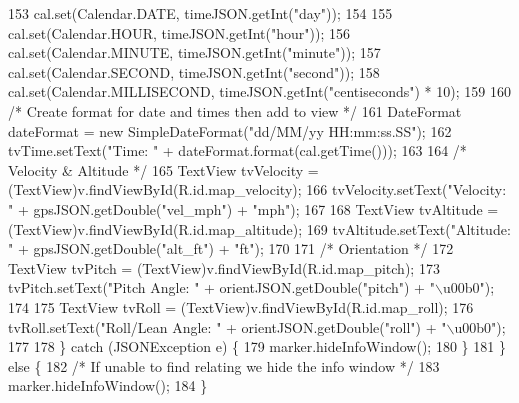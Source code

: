 \begin{DoxyCode}
153                         cal.set(Calendar.DATE, timeJSON.getInt(\textcolor{stringliteral}{"day"}));
154 
155                         cal.set(Calendar.HOUR, timeJSON.getInt(\textcolor{stringliteral}{"hour"}));
156                         cal.set(Calendar.MINUTE, timeJSON.getInt(\textcolor{stringliteral}{"minute"}));
157                         cal.set(Calendar.SECOND, timeJSON.getInt(\textcolor{stringliteral}{"second"}));
158                         cal.set(Calendar.MILLISECOND, timeJSON.getInt(\textcolor{stringliteral}{"centiseconds"}) * 10);
159 
160                         \textcolor{comment}{/* Create format for date and times then add to view */}
161                         DateFormat dateFormat = \textcolor{keyword}{new} SimpleDateFormat(\textcolor{stringliteral}{"dd/MM/yy HH:mm:ss.SS"});
162                         tvTime.setText(\textcolor{stringliteral}{"Time: "} + dateFormat.format(cal.getTime()));
163 
164                         \textcolor{comment}{/* Velocity & Altitude */}
165                         TextView tvVelocity = (TextView)v.findViewById(R.id.map\_velocity);
166                         tvVelocity.setText(\textcolor{stringliteral}{"Velocity: "} + gpsJSON.getDouble(\textcolor{stringliteral}{"vel\_mph"}) + \textcolor{stringliteral}{"mph"});
167 
168                         TextView tvAltitude = (TextView)v.findViewById(R.id.map\_altitude);
169                         tvAltitude.setText(\textcolor{stringliteral}{"Altitude: "} + gpsJSON.getDouble(\textcolor{stringliteral}{"alt\_ft"}) + \textcolor{stringliteral}{"ft"});
170 
171                         \textcolor{comment}{/* Orientation */}
172                         TextView tvPitch = (TextView)v.findViewById(R.id.map\_pitch);
173                         tvPitch.setText(\textcolor{stringliteral}{"Pitch Angle: "} + orientJSON.getDouble(\textcolor{stringliteral}{"pitch"}) + \textcolor{stringliteral}{"\(\backslash\)u00b0"});
174 
175                         TextView tvRoll = (TextView)v.findViewById(R.id.map\_roll);
176                         tvRoll.setText(\textcolor{stringliteral}{"Roll/Lean Angle: "} + orientJSON.getDouble(\textcolor{stringliteral}{"roll"}) + \textcolor{stringliteral}{"\(\backslash\)u00b0"});
177 
178                     \} \textcolor{keywordflow}{catch} (JSONException e) \{
179                         marker.hideInfoWindow();
180                     \}
181                 \} \textcolor{keywordflow}{else} \{
182                     \textcolor{comment}{/* If unable to find relating we hide the info window */}
183                     marker.hideInfoWindow();
184                 \}

\end{DoxyCode}
